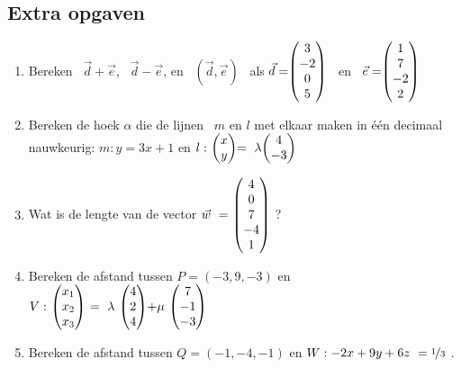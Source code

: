 \subsection{Extra opgaven}
\begin{enumerate}
	\item Bereken 
	\ $ \vec{d} + \vec{e} $, \ $ \vec{d} - \vec{e} $, en \ $  (\vec{d} , \vec{e}) $ \ als 
	\quad $ \vec{d} = \vecvier{3}{-2}{0}{5}  $ \  en \  $  \vec{e} =  \vecvier{1}{7}{-2}{2} $ 	
	
	\item  Bereken de hoek $\alpha$ die de  lijnen \ $  m $ en $ l $ met elkaar maken in één decimaal nauwkeurig:
	$ m:  y = 3x + 1  $ en $ l: \  \vectwee{x}{y} = \  \lambda \vectwee{4}{-3}  $
	
	\item Wat is de lengte van de vector $  \vec{w} \ = \ \vecvijf{4}{0}{7}{-4}{1} $ ?
	
	\item Bereken de afstand tussen  $  P = (-3,9,-3)  $ en 
	$ V: \ \vecdriesnel{x} \ =  \ \lambda \ \vecdrie{4}{2}{4} + \mu \  \vecdrie{7}{-1}{-3} $	
	
	\item   Bereken de afstand tussen  $  Q = (-1,-4,-1)  $ en 
	$ W: -2x + 9y + 6z \ = \nicefrac{1}{3} $ .
\end{enumerate}

